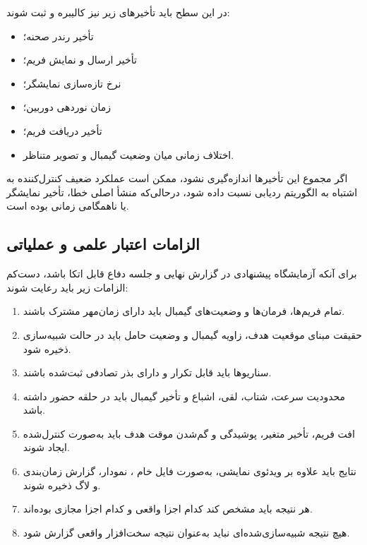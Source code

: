 \documentclass[12pt,a4paper]{article}
\begin{document}
در این سطح باید تأخیرهای زیر نیز کالیبره و ثبت شوند:

\begin{itemize}
	\item تأخیر رندر صحنه؛
	\item تأخیر ارسال و نمایش فریم؛
	\item نرخ تازه‌سازی نمایشگر؛
	\item زمان نوردهی دوربین؛
	\item تأخیر دریافت فریم؛
	\item اختلاف زمانی میان وضعیت گیمبال و تصویر متناظر.
\end{itemize}

اگر مجموع این تأخیرها اندازه‌گیری نشود، ممکن است عملکرد ضعیف
کنترل‌کننده به اشتباه به الگوریتم ردیابی نسبت داده شود، درحالی‌که
منشأ اصلی خطا، تأخیر نمایشگر یا ناهمگامی زمانی بوده است.

\subsection{الزامات اعتبار علمی و عملیاتی}
\label{subsec:hil_validity_requirements}

برای آنکه آزمایشگاه پیشنهادی در گزارش نهایی و جلسه دفاع
قابل اتکا باشد، دست‌کم الزامات زیر باید رعایت شوند:

\begin{enumerate}
	\item
	تمام فریم‌ها، فرمان‌ها و وضعیت‌های گیمبال باید دارای
	زمان‌مهر مشترک باشند.
	
	\item
	حقیقت مبنای موقعیت هدف، زاویه گیمبال و وضعیت حامل باید
	در حالت شبیه‌سازی ذخیره شود.
	
	\item
	سناریوها باید قابل تکرار و دارای بذر تصادفی ثبت‌شده باشند.
	
	\item
	محدودیت سرعت، شتاب، لقی، اشباع و تأخیر گیمبال باید در
	حلقه حضور داشته باشد.
	
	\item
	افت فریم، تأخیر متغیر، پوشیدگی و گم‌شدن موقت هدف باید
	به‌صورت کنترل‌شده ایجاد شوند.
	
	\item
	نتایج باید علاوه بر ویدئوی نمایشی، به‌صورت فایل خام
	، نمودار، گزارش زمان‌بندی و لاگ ذخیره شوند.
	
	\item
	هر نتیجه باید مشخص کند کدام اجزا واقعی و کدام اجزا
	مجازی بوده‌اند.
	
	\item
	هیچ نتیجه شبیه‌سازی‌شده‌ای نباید به‌عنوان نتیجه سخت‌افزار
	واقعی گزارش شود.
\end{enumerate}
\end{document}
